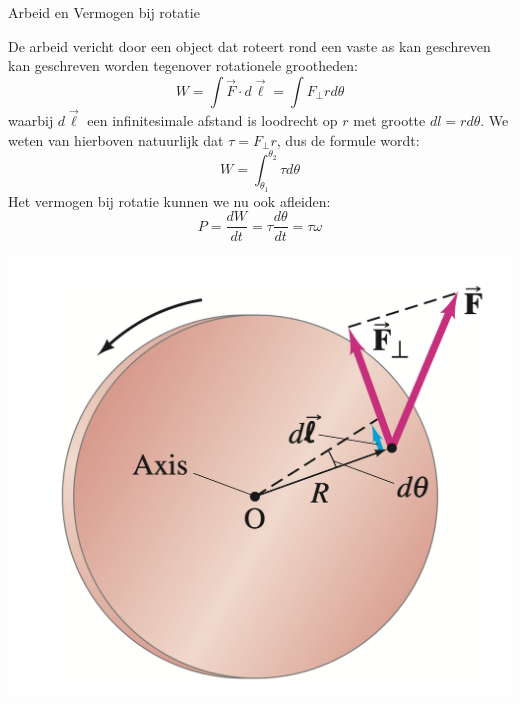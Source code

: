 \begin{app}{Arbeid en Vermogen bij rotatie}
    \begin{minipage}{.66\textwidth}
            De arbeid vericht door een object dat roteert rond een vaste as kan geschreven kan geschreven worden tegenover rotationele grootheden:
            \begin{equation*}
                W = \int \Vec{F} \cdot d\Vec{\ell} = \int F_{\perp}rd\theta
            \end{equation*}
            waarbij $ d\Vec{\ell} $ een infinitesimale afstand is loodrecht op $ r $ met grootte $ dl = rd\theta $. We weten van hierboven natuurlijk dat $ \tau = F_{\perp}r $, dus de formule wordt:
            \begin{equation*}
                W = \int_{\theta_1}^{\theta_2}\tau d\theta
            \end{equation*}
            Het vermogen bij rotatie kunnen we nu ook afleiden:
            \begin{equation*}
                P = \dfrac{dW}{dt} = \tau \dfrac{d\theta}{dt} = \tau \omega
            \end{equation*}
        \end{minipage} 
        \begin{minipage}{.33\textwidth}
            \centering
            \includegraphics[scale = 0.25]{Images/Dynamica/ArbeidBijRotatie.png}
        \end{minipage}
\end{app}

